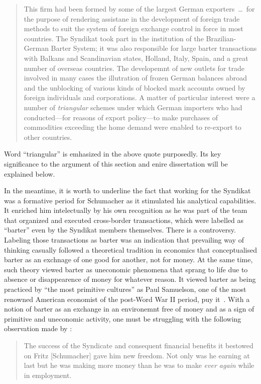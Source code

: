 \begin{quote}
This firm had been formed by some of the largest German exporters~\dots~for the purpose of rendering assistane in the development of foreign trade methods to suit the system of foreign exchange control in force in most countries. The Syndikat took part in the institution of the Brazilian-German Barter System; it was also responsible for large barter transactions with Balkans and Scandinavian states, Holland, Italy, Spain, and a great number of overseas countries. The developemnt of new outlets for trade involved in many cases the illutration of frozen German balances abroad and the unblocking of various kinds of blocked mark accounts owned by foreign individuals and corporations. A matter of particular interest were a number of \textit{triangular} schemes under which German importers who had conducted---for reasons of export policy---to make purchases of commodities exceeding the home demand were enabled to re-export to other countries.
\end{quote}

Word ``triangular'' is emhasized in the above quote purposedly. Its key significance to the argument of this section and enire dissertation will be explained below. 

In the meantime, it is worth to underline the fact that working for the Syndikat was a formative period for Schumacher as it stimulated his analytical capabilities. It enriched him intelectually by his own recognition as he was part of the team that organized and executed cross-border transactions, which were labelled as ``barter'' even by the Syndikat members themselves. There is a controversy. Labeling those transactions as barter was an indication that prevailing way of thinking casually followed a theoretical tradition in economics that conceptualised barter as an exchnage of one good for another, not for money. At the same time, such theory viewed barter as uneconomic phenomena that sprang to life due to absence or disappearence of money for whatever reason. It viewed barter as being practiced by ``the most primitive cultures'' as Paul Samuelson, one of the most renowned American economist of the post-Word War II period, puy it~\citep[quoted in][p.~2]{wray2006}. With a notion of barter as an exchange in an environemnt free of money and as a sign of primitive and uneconomic activity, one must be struggling with the following observation made by \citeauthor{wood1984}:  

\begin{quote}
The success of the Syndicate and consequent financial benefits it bestowed on Fritz [Schumacher] gave him new freedom. Not only was he earning at last but he was making more money than he was to make \textit{ever again} while in employment.~\cite[p.~78, emphasis added]{wood1984}
\end{quote}

